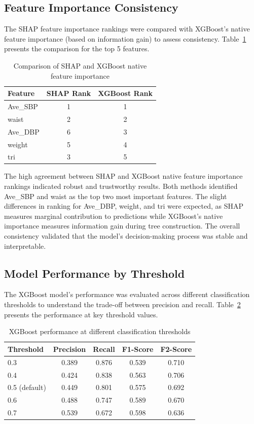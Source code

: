 \subsection{Feature Importance Consistency}

The SHAP feature importance rankings were compared with XGBoost's native feature importance (based on information gain) to assess consistency. Table~\ref{tab:feature_consistency} presents the comparison for the top 5 features.

\begin{table}[htbp]
\centering
\caption{Comparison of SHAP and XGBoost native feature importance}
\label{tab:feature_consistency}
\begin{tabular}{lcc}
\hline
\textbf{Feature} & \textbf{SHAP Rank} & \textbf{XGBoost Rank} \\
\hline
Ave\_SBP & 1 & 1 \\
waist & 2 & 2 \\
Ave\_DBP & 6 & 3 \\
weight & 5 & 4 \\
tri & 3 & 5 \\
\hline
\end{tabular}
\end{table}

The high agreement between SHAP and XGBoost native feature importance rankings indicated robust and trustworthy results. Both methods identified Ave\_SBP and waist as the top two most important features. The slight differences in ranking for Ave\_DBP, weight, and tri were expected, as SHAP measures marginal contribution to predictions while XGBoost's native importance measures information gain during tree construction. The overall consistency validated that the model's decision-making process was stable and interpretable.

\subsection{Model Performance by Threshold}

The XGBoost model's performance was evaluated across different classification thresholds to understand the trade-off between precision and recall. Table~\ref{tab:threshold_performance} presents the performance at key threshold values.

\begin{table}[htbp]
\centering
\caption{XGBoost performance at different classification thresholds}
\label{tab:threshold_performance}
\begin{tabular}{lcccc}
\hline
\textbf{Threshold} & \textbf{Precision} & \textbf{Recall} & \textbf{F1-Score} & \textbf{F2-Score} \\
\hline
0.3 & 0.389 & 0.876 & 0.539 & 0.710 \\
0.4 & 0.424 & 0.838 & 0.563 & 0.706 \\
0.5 (default) & 0.449 & 0.801 & 0.575 & 0.692 \\
0.6 & 0.488 & 0.747 & 0.589 & 0.670 \\
0.7 & 0.539 & 0.672 & 0.598 & 0.636 \\
\hline
\end{tabular}
\end{table}

